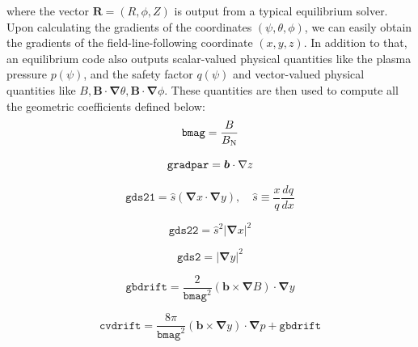 \documentclass{jpp}
\begin{document}
where the vector $\boldsymbol{R}=(R, \phi, Z)$ is output from a typical equilibrium solver. Upon calculating the gradients of the coordinates $(\psi, \theta, \phi)$, we can easily obtain the gradients of the field-line-following coordinate $(x, y, z)$. In addition to that, an equilibrium code also outputs scalar-valued physical quantities like the plasma pressure $p(\psi)$, and the safety factor $q(\psi)$ and vector-valued physical quantities like $B, \boldsymbol{B}\cdot\boldsymbol{\nabla}\theta, \boldsymbol{B}\cdot\boldsymbol{\nabla}\phi$. These quantities are then used to compute all the geometric coefficients defined below:
\begin{equation}
    \texttt{bmag} = \frac{B}{B_{\rm{N}}}
\end{equation}

\begin{equation}
    \texttt{gradpar} = \boldsymbol{b}\cdot\bold{\nabla} z
\end{equation}

\begin{equation}
    \texttt{gds21} = \hat{s}(\boldsymbol{\nabla}x\cdot\boldsymbol{\nabla}y), \quad \hat{s} \equiv \frac{x}{q}\frac{dq}{dx}
\end{equation}

\begin{equation}
    \texttt{gds22} = \hat{s}^2\lvert\boldsymbol{\nabla}x\rvert^2
\end{equation}

\begin{equation}
    \texttt{gds2} = \lvert\boldsymbol{\nabla}y\rvert^2
\end{equation}

\begin{equation}
    \texttt{gbdrift} = \frac{2}{\texttt{bmag}^2}(\boldsymbol{b} \times \boldsymbol{\nabla}B)\cdot \boldsymbol{\nabla}y
\end{equation}

\begin{equation}
    \texttt{cvdrift} =  \frac{8\pi}{\texttt{bmag}^2}  (\boldsymbol{b} \times \boldsymbol{\nabla}y)\cdot \boldsymbol{\nabla}p + \texttt{gbdrift} 
    \label{eqn:cvdrift}
\end{equation}
\end{document}
